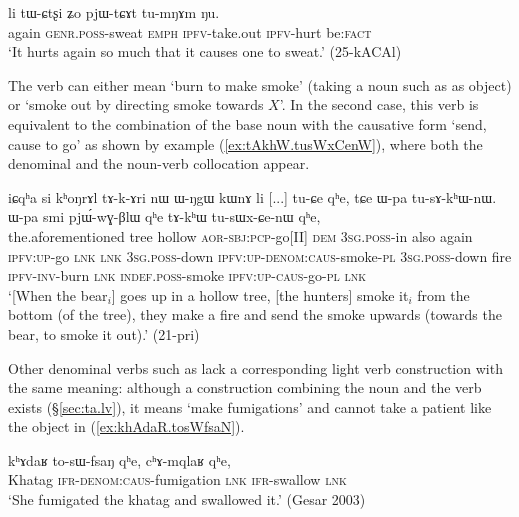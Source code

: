 \begin{exe}
\ex \label{ex:tWCtsxi.pjWtCAt}
 \gll  li tɯ-ɕtʂi ʑo pjɯ-tɕɤt tu-mŋɤm ŋu. \\
 again \textsc{genr}.\textsc{poss}-sweat \textsc{emph} \textsc{ipfv}-take.out \textsc{ipfv}-hurt be:\textsc{fact} \\
 \glt `It hurts again so much that it causes one to sweat.' (25-kACAl)
\end{exe}
 
The verb  can either mean `burn to make smoke' (taking a noun such as  as object) or `smoke out by directing smoke towards $X$'. In the second case, this verb is equivalent to the combination of the base noun  with the causative form  `send, cause to go' as shown by example (\ref{ex:tAkhW.tusWxCenW}), where both the denominal  and the noun-verb collocation appear.

\begin{exe}
\ex \label{ex:tAkhW.tusWxCenW}
 \gll  iɕqʰa si kʰoŋrɤl tɤ-k-ɤri nɯ ɯ-ŋgɯ kɯnɤ li [...] tu-ɕe qʰe, tɕe ɯ-pa tu-sɤ-kʰɯ-nɯ. ɯ-pa smi pjɯ́-wɣ-βlɯ qʰe tɤ-kʰɯ tu-sɯx-ɕe-nɯ qʰe, \\
 the.aforementioned tree hollow \textsc{aor}-\textsc{sbj}:\textsc{pcp}-go[II] \textsc{dem} \textsc{3sg}.\textsc{poss}-in also again {  } \textsc{ipfv}:\textsc{up}-go \textsc{lnk} \textsc{lnk} \textsc{3sg}.\textsc{poss}-down \textsc{ipfv}:\textsc{up}-\textsc{denom}:\textsc{caus}-smoke-\textsc{pl} \textsc{3sg}.\textsc{poss}-down fire \textsc{ipfv}-\textsc{inv}-burn \textsc{lnk} \textsc{indef}.\textsc{poss}-smoke \textsc{ipfv}:\textsc{up}-\textsc{caus}-go-\textsc{pl} \textsc{lnk}  \\
\glt `[When the bear$_i$] goes up in a hollow tree, [the hunters] smoke it$_i$ from the bottom (of the tree), they make a fire and send the smoke upwards (towards the bear, to smoke it out).' (21-pri)
\end{exe}

Other denominal verbs such as  lack a corresponding light verb construction with the same meaning: although a construction combining the noun   and the verb  exists (§\ref{sec:ta.lv}), it means `make fumigations' and cannot take a patient like the object  in (\ref{ex:khAdaR.tosWfsaN}).

\begin{exe}
\ex \label{ex:khAdaR.tosWfsaN}
 \gll kʰɤdaʁ to-sɯ-fsaŋ qʰe, cʰɤ-mqlaʁ qʰe, \\
 Khatag \textsc{ifr}-\textsc{denom}:\textsc{caus}-fumigation \textsc{lnk} \textsc{ifr}-swallow \textsc{lnk} \\
\glt `She fumigated the khatag and swallowed it.' (Gesar 2003)
\end{exe}


